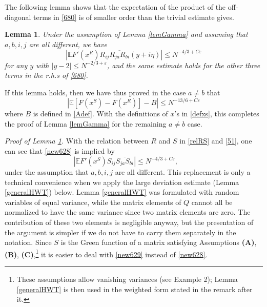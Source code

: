 \documentclass[draft]{article}
\newcommand{\e}{\varepsilon}
\newcommand{\be}{\begin{equation}}
\newcommand{\ee}{\end{equation}}
\newcommand{\E}{{\mathbb E }}
\newtheorem{lemma}[theorem]{Lemma}
\newcommand{\qed}{\hfill\fbox{}\par\vspace{0.3mm}}
\numberwithin{equation}{section}
\numberwithin{theorem}{section}
\numberwithin{definition}{section}
\numberwithin{remark}{section}
\begin{document}
The following lemma shows that
 the expectation of the product of the 
off-diagonal terms in \eqref{680}
is of smaller order than the trivial estimate gives.







\begin{lemma} \label{lem: 52} Under the assumption of Lemma \ref{lemGamma}
and assuming that $a, b, i, j$ are all different,
we have
\be\label{new628}  
|\E F'(x^R)R_{ij}\overline{R_{ja}R_{bi}}(y+i\eta)|\leq N^{-4/3+C\e}
\ee
for any $y$ with $|y-2|\le N^{-2/3+\e}$,
and the same estimate holds for the other three terms in the r.h.s of  \eqref{680}.  
\end{lemma}

If this lemma holds, then we have thus proved  in the case $a \not = b$ that
\be\label{FF1232}
\left|\E  [ F(x^S)- F(x^R) ] 
- B  \right|\leq N^{-13/6+C\e}
\ee
where $B$ is defined in \eqref{Adef}. With the definitions of $x$'s in \eqref{defxs}, 
this completes the proof of Lemma \ref{lemGamma} for the remaining $a\ne b$ case. \qed

\bigskip

{\it Proof of Lemma \ref{lem: 52}. } With the relation between $R$ and $S$ 
in \eqref{relRS} and \eqref{51},
one can see that \eqref{new628} is implied by 
\be\label{new629}
|\E F'(x^S)S_{ij}\overline{S_{ja}S_{bi}}|\leq N^{-4/3+C\e},\,\,\,\,\,\,\,\,\,\,\,\,\,
\ee 
under the assumption that $a,b,i,j$ are all different.
This replacement is only a technical convenience
when we apply the large deviation
estimate (Lemma \ref{generalHWT}) below. 
Lemma \ref{generalHWT} was formulated
with random variables of equal variance, while
the matrix elements of $Q$ cannot all be normalized to
have the same variance since two matrix elements are zero.
The contribution of these two elements is negligible anyway, 
but the presentation of the argument is simpler if we do not
have to carry them separately in the notation. 
Since $S$ is the Green function of a matrix satisfying Assumptions {\bf (A)}, {\bf (B)}, {\bf (C)},\footnote{These
assumptions allow vanishing variances (see Example 2); Lemma \ref{generalHWT} is then used in the
weighted form stated in the remark after it.}
it is easier to deal with
\eqref{new629} instead of \eqref{new628}.
\end{document}
